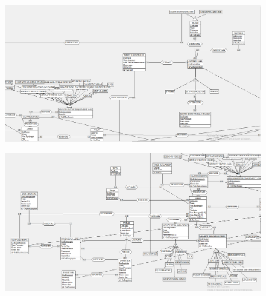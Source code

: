 \begin{figure}
	\includegraphics[width=1.2\textwidth]{./img/Schema_Finale3.png}
	\caption{}
	\label{fig:s3}
\end{figure}

\begin{figure}
	\includegraphics[width=1.2\textwidth]{./img/Schema_Finale4.png}
	\caption{}
	\label{fig:s4}
\end{figure}

\restoregeometry

